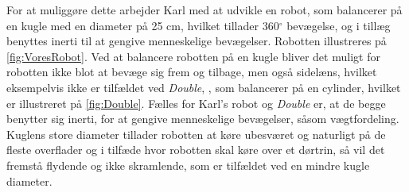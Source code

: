 For at muliggøre dette arbejder Karl med at udvikle en robot, som balancerer på en kugle med en diameter på 25 cm, hvilket tillader 360$^{\circ}$ bevægelse, og i tillæg benyttes inerti til at gengive menneskelige bevægelser. Robotten illustreres på \autoref{fig:VoresRobot}. Ved at balancere robotten på en kugle bliver det muligt for robotten ikke blot at bevæge sig frem og tilbage, men også sidelæns, hvilket eksempelvis ikke er tilfældet ved \textit{Double}, \parencite{WEB:Double}, som balancerer på en cylinder, hvilket er illustreret på \autoref{fig:Double}. Fælles for Karl's robot og \textit{Double} er, at de begge benytter sig inerti, for at gengive menneskelige bevægelser, såsom vægtfordeling. Kuglens store diameter tillader robotten at køre ubesværet og naturligt på de fleste overflader og i tilfæde hvor robotten skal køre over et dørtrin, så vil det fremstå flydende og ikke skramlende, som er tilfældet ved en mindre kugle diameter. 
%
